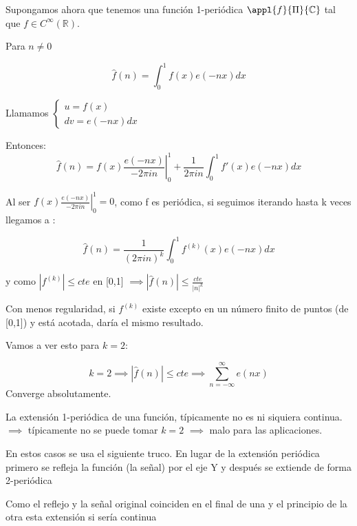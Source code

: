 \begin{example}
	Supongamos ahora que tenemos una función 1-periódica $\appl{f}{\Pi}{\mathbb{C}}$ tal que $f \in C^{\infty}(\mathbb{R})$.

	Para $n \neq 0$

	$$\widehat{f}(n) = \int_{0}^{1} f(x) e(-nx) dx$$

	Llamamos $\begin{cases}
	u = f(x)\\
	dv = e(-nx) dx
	\end{cases}$

	Entonces:
	$$\widehat{f}(n) = f(x) \left.\frac{e(-nx)}{-2\pi in}\right|_{0}^1 + \frac{1}{2\pi i n} \int_{0}^1 f'(x) e(-nx) dx$$

	Al ser $f(x) \left.\frac{e(-nx)}{-2\pi in}\right|_{0}^1 =0$, como f es periódica, si seguimos iterando hasta k veces llegamos a :

	$$\widehat{f}(n) = \frac{1}{(2\pi i n)^k} \int_{0}^1 f^{(k)}(x) e(-nx) dx$$

	y como $|f^{(k)}| \leq cte$ en [0,1] $\implies |\widehat{f}(n)| \leq \frac{cte}{|n|^k}$
\end{example}

	Con menos regularidad, si $f^{(k)}$ existe excepto en un número finito de puntos (de [0,1]) y está acotada, daría el mismo resultado.

	Vamos a ver esto para $k=2$:

\begin{example}
	$$k=2 \implies |\widehat{f}(n)| \leq cte \implies \sum_{n= -\infty}^{\infty} e(nx)$$
	Converge absolutamente.


\begin{center}
	\centering
\end{center}

	La extensión 1-periódica de una función, típicamente no es ni siquiera continua. $\implies$ típicamente no se puede tomar $k=2$ $\implies$ malo para las aplicaciones.

\end{example}

	En estos casos se usa el siguiente truco. En lugar de la extensión periódica primero se refleja la función (la señal) por el eje Y y después se extiende de forma 2-periódica

	Como el reflejo y la señal original coinciden en el final de una y el principio de la otra esta extensión si sería continua


	\begin{center}
		\centering
	\end{center}


